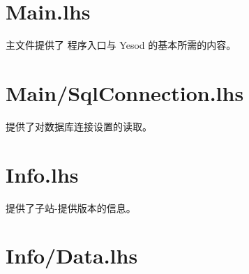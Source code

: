 










  \maketitle
  \newpage
  \tableofcontents
  \newpage

  \section[程序主文件 Main.lhs]{Main.lhs}
  主文件提供了 程序入口与 Yesod 的基本所需的内容。
  

  \section[设置载入文件 Main/SqlConnection.lhs]{Main/SqlConnection.lhs}
  提供了对数据库连接设置的读取。
  

  \section[子站-提供版本信息 Info.lhs]{Info.lhs}
  提供了子站-提供版本的信息。
  

  \section[辅助Info.lhs]{Info/Data.lhs}
  


